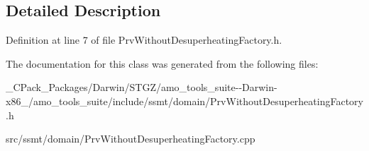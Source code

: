 \subsection{Detailed Description}


Definition at line 7 of file Prv\+Without\+Desuperheating\+Factory.\+h.



The documentation for this class was generated from the following files\+:\begin{DoxyCompactItemize}
\item 
\+\_\+\+C\+Pack\+\_\+\+Packages/\+Darwin/\+S\+T\+G\+Z/amo\+\_\+tools\+\_\+suite-\/-\/\+Darwin-\/x86\+\_/amo\+\_\+tools\+\_\+suite/include/ssmt/domain/Prv\+Without\+Desuperheating\+Factory.\+h\item 
src/ssmt/domain/Prv\+Without\+Desuperheating\+Factory.\+cpp\end{DoxyCompactItemize}
